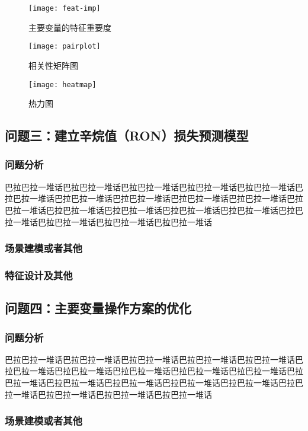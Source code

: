 \documentclass[bwprint]{gmcmthesis}
\begin{document}
\begin{figure}[htbp]
	\centering
	\texttt{[image: feat-imp]}
	\caption{主要变量的特征重要度}
\end{figure}

\begin{figure}[htbp]
	\centering
	\texttt{[image: pairplot]}
	\caption{相关性矩阵图}
\end{figure}

\begin{figure}[htbp]
	\centering
	\texttt{[image: heatmap]}
	\caption{热力图}
\end{figure}

\subsection{问题三：建立辛烷值（RON）损失预测模型}
\subsubsection{问题分析}

巴拉巴拉一堆话巴拉巴拉一堆话巴拉巴拉一堆话巴拉巴拉一堆话巴拉巴拉一堆话巴拉巴拉一堆话巴拉巴拉一堆话巴拉巴拉一堆话巴拉巴拉一堆话巴拉巴拉一堆话巴拉巴拉一堆话巴拉巴拉一堆话巴拉巴拉一堆话巴拉巴拉一堆话巴拉巴拉一堆话巴拉巴拉一堆话巴拉巴拉一堆话巴拉巴拉一堆话巴拉巴拉一堆话

\subsubsection{场景建模或者其他}

\subsubsection{特征设计及其他}
\subsection{问题四：主要变量操作方案的优化}
\subsubsection{问题分析}

巴拉巴拉一堆话巴拉巴拉一堆话巴拉巴拉一堆话巴拉巴拉一堆话巴拉巴拉一堆话巴拉巴拉一堆话巴拉巴拉一堆话巴拉巴拉一堆话巴拉巴拉一堆话巴拉巴拉一堆话巴拉巴拉一堆话巴拉巴拉一堆话巴拉巴拉一堆话巴拉巴拉一堆话巴拉巴拉一堆话巴拉巴拉一堆话巴拉巴拉一堆话巴拉巴拉一堆话巴拉巴拉一堆话
\subsubsection{场景建模或者其他}
\end{document}
